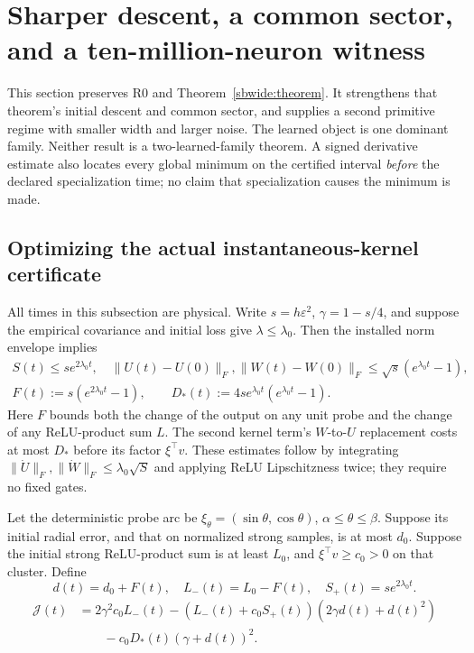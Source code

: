 \documentclass{article} %
\theoremstyle{plain}
\theoremstyle{definition}
\theoremstyle{remark}
\begin{document}
\section{Sharper descent, a common sector, and a ten-million-neuron witness}
\label{sbsharp:scope}

This section preserves R0 and Theorem~\ref{sbwide:theorem}. It strengthens
that theorem's initial descent and common sector, and supplies a second
primitive regime with smaller width and larger noise. The learned object
is one dominant family. Neither result is a two-learned-family theorem.
A signed derivative estimate also locates every global minimum on the
certified interval \emph{before} the declared specialization time; no
claim that specialization causes the minimum is made.

\subsection{Optimizing the actual instantaneous-kernel certificate}

All times in this subsection are physical. Write $s=h\varepsilon^2$,
$\gamma=1-s/4$, and suppose the empirical covariance and initial loss give
$\lambda\le\lambda_0$. Then the installed norm envelope implies
\begin{gather*}
 S(t)\le s e^{2\lambda_0t},\quad
 \|U(t)-U(0)\|_F,\|W(t)-W(0)\|_F
       \le\sqrt{s}(e^{\lambda_0t}-1),\\
 F(t):=s(e^{2\lambda_0t}-1),\qquad
 D_*(t):=4s e^{\lambda_0t}(e^{\lambda_0t}-1).
\end{gather*}
Here $F$ bounds both the change of the output on any unit probe and the
change of any ReLU-product sum $L$. The second kernel term's
$W$-to-$U$ replacement costs at most $D_*$ before its factor
$\xi^\top v$. These estimates follow by integrating
$\|\dot U\|_F,\|\dot W\|_F\le\lambda_0\sqrt S$ and applying
ReLU Lipschitzness twice; they require no fixed gates.

Let the deterministic probe arc be
$\xi_\theta=(\sin\theta,\cos\theta)$, $\alpha\le\theta\le\beta$.
Suppose its initial radial error, and that on normalized strong samples,
is at most $d_0$. Suppose the initial strong ReLU-product sum is at least
$L_0$, and $\xi^\top v\ge c_0>0$ on that cluster. Define
\[
 d(t)=d_0+F(t),\quad L_-(t)=L_0-F(t),\quad S_+(t)=se^{2\lambda_0t}.
\]
\begin{align*}
 \mathcal J(t)&=2\gamma^2c_0 L_-(t)
 -(L_-(t)+c_0S_+(t))(2\gamma d(t)+d(t)^2)\\
 &\hspace{2em}-c_0D_*(t)(\gamma+d(t))^2.
\end{align*}
\end{document}
